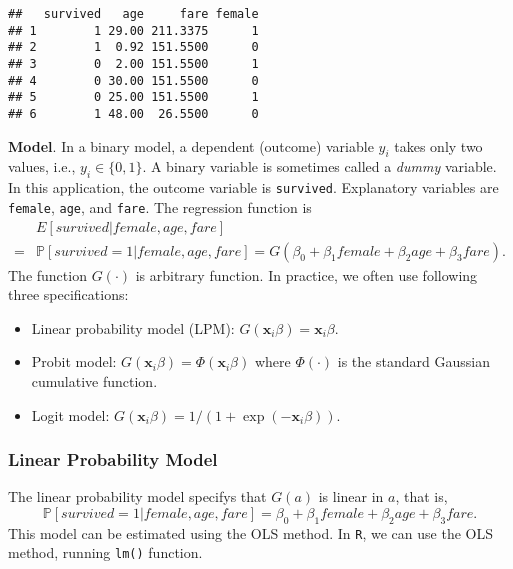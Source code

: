 \documentclass[
  12pt,
]{article}
\providecommand{\tightlist}{%
  \setlength{\itemsep}{0pt}\setlength{\parskip}{0pt}}
\begin{document}
\begin{verbatim}
##   survived   age     fare female
## 1        1 29.00 211.3375      1
## 2        1  0.92 151.5500      0
## 3        0  2.00 151.5500      1
## 4        0 30.00 151.5500      0
## 5        0 25.00 151.5500      1
## 6        1 48.00  26.5500      0
\end{verbatim}

\noindent
\textbf{Model}.
In a binary model, a dependent (outcome) variable \(y_i\) takes only two values, i.e., \(y_i \in \{0, 1\}\).
A binary variable is sometimes called a \emph{dummy} variable.
In this application, the outcome variable is \texttt{survived}.
Explanatory variables are \texttt{female}, \texttt{age}, and \texttt{fare}.
The regression function is
\begin{equation*}
  \begin{split}
    &E[survived | female, age, fare] \\
    =& \mathbb{P}[survived = 1 | female, age, fare]
    = G(\beta_0 + \beta_1 female + \beta_2 age + \beta_3 fare).
  \end{split}
\end{equation*}
The function \(G(\cdot)\) is arbitrary function. In practice, we often use following three specifications:

\begin{itemize}
\tightlist
\item
  Linear probability model (LPM): \(G(\mathbf{x}_i \beta) = \mathbf{x}_i \beta\).
\item
  Probit model: \(G(\mathbf{x}_i \beta) = \Phi(\mathbf{x}_i \beta)\) where \(\Phi(\cdot)\) is the standard Gaussian cumulative function.
\item
  Logit model: \(G(\mathbf{x}_i \beta) = 1/(1 + \exp(-\mathbf{x}_i \beta))\).
\end{itemize}

\hypertarget{linear-probability-model}{%
\subsubsection{Linear Probability Model}\label{linear-probability-model}}

The linear probability model specifys that \(G(a)\) is linear in \(a\), that is,
\begin{equation*}
  \mathbb{P}[survived = 1 | female, age, fare]
  = \beta_0 + \beta_1 female + \beta_2 age + \beta_3 fare.
\end{equation*}
This model can be estimated using the OLS method.
In \texttt{R}, we can use the OLS method, running \texttt{lm()} function.
\end{document}
